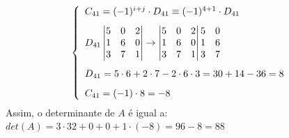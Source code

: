 \documentclass[12pt]{article}
\begin{document}
\begin{itemize}
        \[
        \left\{
        \begin{array}{l}
            \vspace{8pt}
            C_{41} = (-1)^{i+j} \cdot D_{41} \equiv (-1)^{4+1}\cdot D_{41} \\
            
            \vspace{8pt}
            D_{41}
            \begin{vmatrix}
                5 & 0 & 2 \\
                1 & 6 & 0 \\
                3 & 7 & 1 
            \end{vmatrix}
            \rightarrow
            \begin{vmatrix}
                5 & 0 & 2 \\
                1 & 6 & 0 \\
                3 & 7 & 1 
            \end{vmatrix}
            \begin{matrix}
                5 & 0 \\
                1 & 6 \\
                3 & 7 
            \end{matrix} \\
            \vspace{8pt}
            D_{41} = 5\cdot 6 + 2 \cdot 7 - 2\cdot6\cdot3 = 30 + 14 - 36 = 8 \\
            C_{41} = (-1)\cdot 8 = -8
            
        \end{array}
        \right.
        \]
        Assim, o determinante de $A$ é igual a: $det(A) = 3 \cdot 32 + 0 + 0 + 
        1 \cdot (-8) = 96 - 8 = 88$
        
    \end{itemize}
\end{document}
